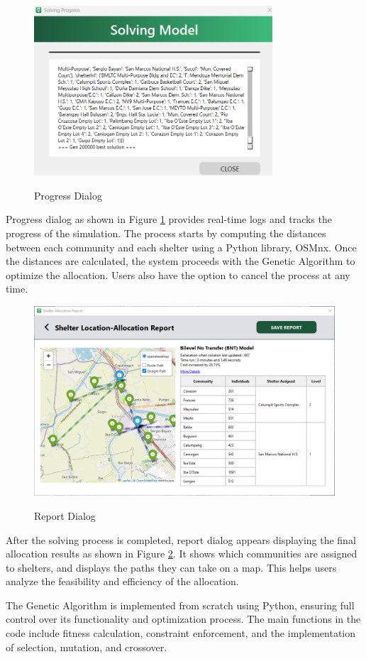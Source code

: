 	\begin{figure}[h!]
		\caption{Progress Dialog}
		\centering
		\includegraphics[width=3.5in]{Chapter 4/progress}
		\label{solveProg}
	\end{figure}
	Progress dialog as shown in Figure \ref{solveProg} provides real-time logs and tracks the progress of the simulation. The process starts by computing the distances between each community and each shelter using a Python library, OSMnx. Once the distances are calculated, the system proceeds with the Genetic Algorithm to optimize the allocation. Users also have the option to cancel the process at any time.
	
	\begin{figure}[h!]
		\caption{Report Dialog}
		\centering
		\includegraphics[width=4.5in]{Chapter 4/alloc report}
		\label{shelAllocRep}
	\end{figure}
	After the solving process is completed, report dialog appears displaying the final allocation results as shown in Figure \ref{shelAllocRep}. It shows which communities are assigned to shelters, and displays the paths they can take on a map. This helps users analyze the feasibility and efficiency of the allocation.
	
	The Genetic Algorithm is implemented from scratch using Python, ensuring full control over its functionality and optimization process. The main functions in the code include fitness calculation, constraint enforcement, and the implementation of selection, mutation, and crossover.
	
